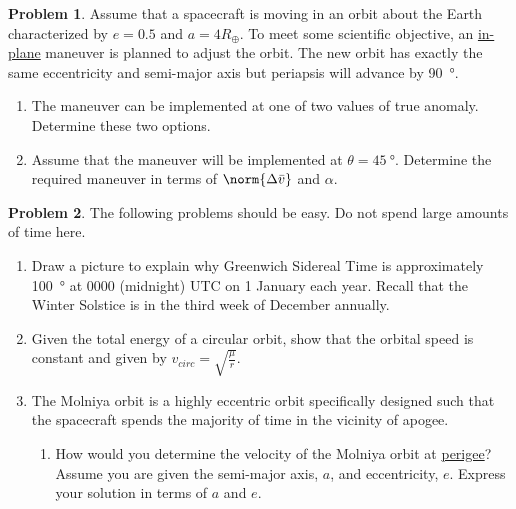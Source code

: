 \documentclass[10pt]{article}
\theoremstyle{definition}
\newtheorem{prob}{Problem}[section]
\newenvironment{subprob}%
{\renewcommand{\theenumi}{\alph{enumi}}\renewcommand{\labelenumi}{(\theenumi)}\begin{enumerate}}%
{\end{enumerate}}%
\newcommand{\extrapage}{\clearpage\newpage\null\newpage}
\begin{document}
\extrapage
\extrapage

\begin{prob}
    Assume that a spacecraft is moving in an orbit about the Earth characterized by \( e = 0.5\) and \( a = 4 R_\oplus\).
    To meet some scientific objective, an \underline{in-plane} maneuver is planned to adjust the orbit.
    The new orbit has exactly the same eccentricity and semi-major axis but periapsis will advance by \SI{90}{\degree}.
    \begin{subprob}
        \item The maneuver can be implemented at one of two values of true anomaly. 
            Determine these two options.
        \item Assume that the maneuver will be implemented at \( \theta = \SI{45}{\degree}\).
            Determine the required maneuver in terms of \( \norm{\Delta \bar v} \) and \(\alpha\).
    \end{subprob}
\end{prob}

\extrapage
\extrapage

\begin{prob}
The following problems should be easy. 
Do not spend large amounts of time here.
\begin{subprob}
\item Draw a picture to explain why Greenwich Sidereal Time is approximately \SI{100}{\degree} at 0000 (midnight) UTC on 1 January each year.
    Recall that the Winter Solstice is in the third week of December annually.

    \vspace{8cm}
\item Given the total energy of a circular orbit, show that the orbital speed is constant and given by \( v_{circ} = \sqrt{\frac{\mu}{r}}\).

    \vspace{5cm}

\item The Molniya orbit is a highly eccentric orbit specifically designed such that the spacecraft spends the majority of time in the vicinity of apogee.

    \begin{subprob}

    \item How would you determine the velocity of the Molniya orbit  at \underline{perigee}?
    Assume you are given the semi-major axis, \( a \), and eccentricity, \( e\).
    Express your solution in terms of \( a \) and \( e\).

    \end{subprob}
\end{subprob}
\end{prob}
\end{document}
